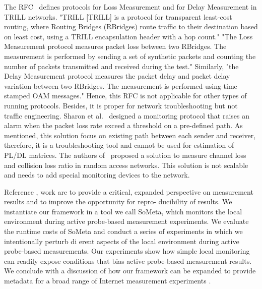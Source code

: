 \documentclass[10pt, journal, letterpaper]{IEEEtran}
\begin{document}
The RFC~\cite{mizrahi2015loss} defines protocols for Loss Measurement and for Delay Measurement in TRILL networks. "TRILL [TRILL] is a protocol for transparent least-cost routing, where Routing Bridges (RBridges) route traffic to their destination based on least cost, using a TRILL encapsulation header with a hop count." "The Loss Measurement protocol measures packet loss between two RBridges. The measurement is performed by sending a set of synthetic packets and counting the number of packets transmitted and received during the test." Similarly, "the Delay Measurement protocol measures the packet delay and packet delay variation between two RBridges. The measurement is performed using time stamped OAM messages." Hence, this RFC is not applicable for other types of running protocols. Besides, it is proper for network troubleshooting but not traffic engineering.
Sharon et al.~\cite{goldberg2015path} designed a monitoring protocol that raises an alarm when the packet loss rate exceed a threshold on a pre-defined path. As mentioned, this solution focus on existing path between each sender and receiver, therefore, it is a troubleshooting tool and cannot be used for estimation of PL/DL matrices.
The authors of~\cite{salonidis2015device} proposed a solution to measure channel loss and collision loss ratio in random access networks. This solution is not scalable and needs to add special monitoring devices to the network.

Reference \cite{sommers2017automatic},   work are to provide a critical, expanded perspective on measurement results and to improve the opportunity for repro- ducibility of results. We instantiate our framework in a tool we call SoMeta, which monitors the local environment during active probe-based measurement experiments. We evaluate the runtime costs of SoMeta and conduct a series of experiments in which we intentionally perturb di erent aspects of the local environment during active probe-based measurements. Our experiments show how simple local monitoring can readily expose conditions that bias active probe-based measurement results. We conclude with a discussion of how our framework can be expanded to provide metadata for a broad range of Internet measurement experiments \cite{sommers2017automatic}.
\end{document}
